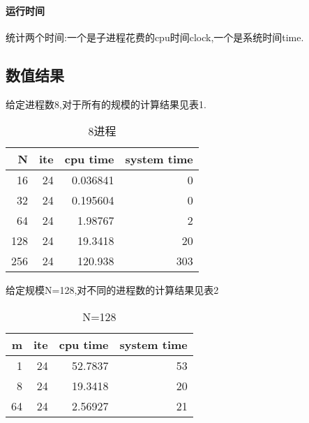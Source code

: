 \documentclass[UTF8]{ctexart}
\begin{document}
\paragraph{运行时间}
统计两个时间:一个是子进程花费的cpu时间clock,一个是系统时间time.
\subsection{数值结果}
给定进程数8,对于所有的规模的计算结果见表1.
\begin{table}\caption{8进程}
\centering
\begin{tabular}{|r|r|r|r|}
\hline
N & ite & cpu time&system time  \\ \hline
   16 & 24 &0.036841 &0  \\
    32&  24 & 0.195604 & 0 \\
    64 & 24 & 1.98767 & 2\\
    128 & 24 & 19.3418&20 \\
    256 & 24 & 120.938&303 \\
\hline
\end{tabular}
\end{table}
给定规模N=128,对不同的进程数的计算结果见表2
\begin{table}\caption{N=128}
\centering
\begin{tabular}{|r|r|r|r|} 
\hline
m & ite & cpu time&system time  \\ \hline
   1 & 24 & 52.7837& 53\\
    8& 24 &19.3418&20\\
    64 & 24 & 2.56927 & 21\\
\hline
\end{tabular}
\end{table}
\end{document}
